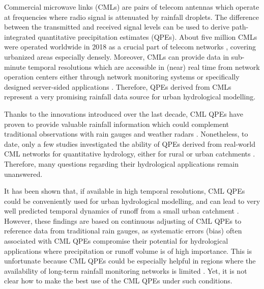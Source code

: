 \documentclass{ctuthesis}\usepackage[]{graphicx}\usepackage[]{color}
\begin{document}
Commercial microwave links (CMLs) are pairs of telecom antennas which operate at frequencies where radio signal is attenuated by rainfall droplets. The difference between the transmitted and received signal levels can be used to derive path-integrated quantitative precipitation estimates (QPEs). About five million CMLs were operated worldwide in 2018 as a crucial part of telecom networks \citep{ericssonEricssonMicrowaveOutlook2018}, covering urbanized areas especially densely. Moreover, CMLs can provide data in sub-minute temporal resolutions which are accessible in (near) real time from network operation centers either through network monitoring systems or specifically designed server-sided applications \citep{chwalaRealtimeDataAcquisition2016}. Therefore, QPEs derived from CMLs represent a very promising rainfall data source for urban hydrological modelling.

Thanks to the innovations introduced over the last decade, CML QPEs have proven to provide valuable rainfall information which could complement traditional observations with rain gauges and weather radars \citep{chwalaCommercialMicrowaveLink2019, imhoffRainfallNowcastingUsing2020, riosgaonaRainfallRetrievalCommercial2018, uijlenhoetOpportunisticRemoteSensing2018}. Nonetheless, to date, only a few studies investigated the ability of QPEs derived from real-world CML networks for quantitative hydrology, either for rural \citep{brauerEffectDifferencesRainfall2016, cazzanigaCalculatingHydrologicalResponse2020, smiatekPotentialCommercialMicrowave2017} or urban catchments \citep{dischImpactDifferentSources2019, stranskyRunoffPredictionUsing2018}. Therefore, many questions regarding their hydrological applications remain unanswered.

It has been shown that, if available in high temporal resolutions, CML QPEs could be conveniently used for urban hydrological modelling, and can lead to very well predicted temporal dynamics of runoff from a small urban catchment \citep{dischImpactDifferentSources2019, stranskyRunoffPredictionUsing2018}. However, these findings are based on continuous adjusting of CML QPEs to reference data from traditional rain gauges, as systematic errors (bias) often associated with CML QPEs \citep{fenclGaugeadjustedRainfallEstimates2017, chwalaCommercialMicrowaveLink2019} compromise their potential for hydrological applications where precipitation or runoff volume is of high importance. This is unfortunate because CML QPEs could be especially helpful in regions where the availability of long-term rainfall monitoring networks is limited \citep{gossetImprovingRainfallMeasurement2016}. Yet, it is not clear how to make the best use of the CML QPEs under such conditions.
\end{document}
